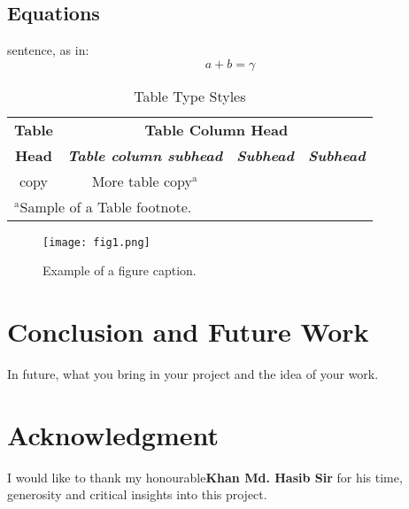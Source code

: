 \documentclass[conference]{IEEEtran}
\begin{document}
\subsection{Equations}


sentence, as in:
\begin{equation}
a+b=\gamma\label{eq}
\end{equation}





\begin{table}[htbp]
\caption{Table Type Styles}
\begin{center}
\begin{tabular}{|c|c|c|c|}
\hline
\textbf{Table}&\multicolumn{3}{|c|}{\textbf{Table Column Head}} \\
\cline{2-4} 
\textbf{Head} & \textbf{\textit{Table column subhead}}& \textbf{\textit{Subhead}}& \textbf{\textit{Subhead}} \\
\hline
copy& More table copy$^{\mathrm{a}}$& &  \\
\hline
\multicolumn{4}{l}{$^{\mathrm{a}}$Sample of a Table footnote.}
\end{tabular}
\label{tab1}
\end{center}
\end{table}

\begin{figure}[htbp]
\centerline{\texttt{[image: fig1.png]}}
\caption{Example of a figure caption.}
\label{fig}
\end{figure}



\section{Conclusion and Future Work}

In future, what you bring in your project and the idea of your work.

\section*{Acknowledgment}

I would like to thank my honourable\textbf{Khan Md. Hasib Sir} for his time, generosity and critical insights into this project.
\end{document}
